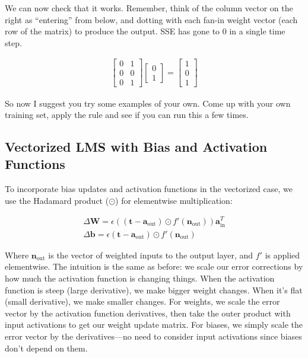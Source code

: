 We can now check that it works. Remember, think of the column vector on the right as ``entering'' from below, and dotting with each fan-in weight vector (each row of the matrix) to produce the output. SSE has gone to 0 in a single time step.

\begin{align*}
\begin{bmatrix} 0 & 1 \\ 0 & 0 \\  0  & 1  \end{bmatrix}
\begin{bmatrix} 0 \\ 1 \end{bmatrix}
= \begin{bmatrix} 1 \\ 0 \\ 1  \end{bmatrix}
\end{align*}

So now I suggest you try some examples of your own. Come up with your own training set, apply the rule and see if you can run this a few times. 

\subsection{Vectorized LMS with Bias and Activation Functions}

To incorporate bias updates and activation functions in the vectorized case, we use the Hadamard product ($\odot$) for elementwise multiplication:

\begin{eqnarray*}
\Delta \mathbf{W}  =  \epsilon ((\mathbf{t} - \mathbf{a}_{\text{out}}) \odot f'( \mathbf{n}_{\text{out}})) \mathbf{a}_{\text{in}}^T \\
\Delta \mathbf{b}  =  \epsilon (\mathbf{t} - \mathbf{a}_{\text{out}}) \odot f'( \mathbf{n}_{\text{out}})
\end{eqnarray*}

Where $\mathbf{n}_{\text{out}}$ is the vector of weighted inputs to the output layer, and $f'$ is applied elementwise. The intuition is the same as before: we scale our error corrections by how much the activation function is changing things. When the activation function is steep (large derivative), we make bigger weight changes. When it's flat (small derivative), we make smaller changes. For weights, we scale the error vector by the activation function derivatives, then take the outer product with input activations to get our weight update matrix. For biases, we simply scale the error vector by the derivatives—no need to consider input activations since biases don't depend on them.

